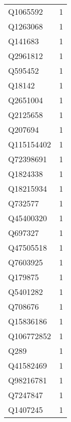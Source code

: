 \begin{tabular}{lr}
    Q1065592 &                             1 \\
    Q1263068 &                             1 \\
     Q141683 &                             1 \\
    Q2961812 &                             1 \\
     Q595452 &                             1 \\
      Q18142 &                             1 \\
    Q2651004 &                             1 \\
    Q2125658 &                             1 \\
     Q207694 &                             1 \\
  Q115154402 &                             1 \\
   Q72398691 &                             1 \\
    Q1824338 &                             1 \\
   Q18215934 &                             1 \\
     Q732577 &                             1 \\
   Q45400320 &                             1 \\
     Q697327 &                             1 \\
   Q47505518 &                             1 \\
    Q7603925 &                             1 \\
     Q179875 &                             1 \\
    Q5401282 &                             1 \\
     Q708676 &                             1 \\
   Q15836186 &                             1 \\
  Q106772852 &                             1 \\
        Q289 &                             1 \\
   Q41582469 &                             1 \\
   Q98216781 &                             1 \\
    Q7247847 &                             1 \\
    Q1407245 &                             1 \\
\bottomrule
\end{tabular}
